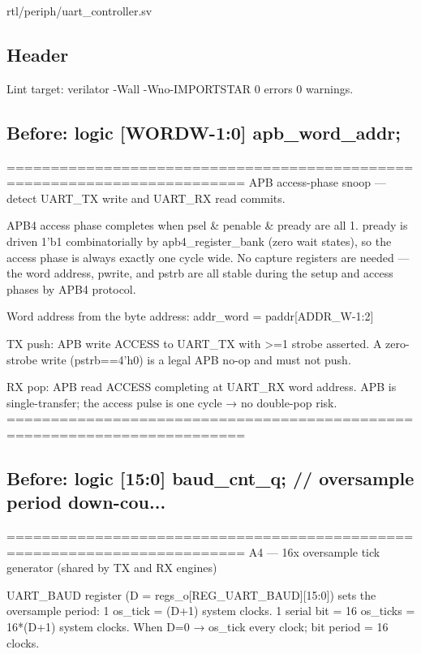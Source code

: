\begin{relocated}{rtl/periph/uart_controller.sv}

\subsection*{Header}

\begin{textblock}
Lint target: verilator -Wall -Wno-IMPORTSTAR 0 errors 0 warnings.
\end{textblock}

\subsection*{Before: logic [WORDW-1:0] apb\_word\_addr;}

\begin{textblock}
=========================================================================
APB access-phase snoop — detect UART_TX write and UART_RX read commits.

APB4 access phase completes when psel & penable & pready are all 1.
pready is driven 1'b1 combinatorially by apb4_register_bank (zero wait
states), so the access phase is always exactly one cycle wide.  No capture
registers are needed — the word address, pwrite, and pstrb are all stable
during the setup and access phases by APB4 protocol.

Word address from the byte address:
  addr_word = paddr[ADDR_W-1:2]

TX push: APB write ACCESS to UART_TX with >=1 strobe asserted.
  A zero-strobe write (pstrb==4'h0) is a legal APB no-op and must not push.

RX pop:  APB read ACCESS completing at UART_RX word address.
  APB is single-transfer; the access pulse is one cycle → no double-pop risk.
=========================================================================
\end{textblock}

\subsection*{Before: logic [15:0] baud\_cnt\_q;   // oversample period down-cou...}

\begin{textblock}
=========================================================================
A4 — 16x oversample tick generator (shared by TX and RX engines)

UART_BAUD register (D = regs_o[REG_UART_BAUD][15:0]) sets the oversample
period: 1 os_tick = (D+1) system clocks.
1 serial bit = 16 os_ticks = 16*(D+1) system clocks.
When D=0 → os_tick every clock; bit period = 16 clocks.


\end{textblock}
\end{relocated}
